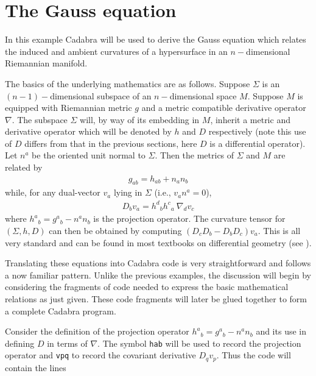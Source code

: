 \documentclass[a4paper,12pt]{article}
\numberwithin{equation}{section}%
\begin{document}
\clearpage

\section{The Gauss equation}
\label{sec:ex-09}
\setcounter{ExerciseNum}{0}



In this example Cadabra will be used to derive the Gauss equation which relates the induced
and ambient curvatures of a hypersurface in an $n-$dimensional Riemannian manifold.

The basics of the underlying mathematics are as follows. Suppose $\Sigma$ is an
$(n-1)-$dimensional subspace of an $n-$dimensional space $M$. Suppose $M$ is equipped with
Riemannian metric $g$ and a metric compatible derivative operator $\nabla$. The subspace
$\Sigma$ will, by way of its embedding in $M$, inherit a metric and derivative operator
which will be denoted by $h$ and $D$ respectively (note this use of $D$ differs from that in
the previous sections, here $D$ is a differential operator). Let $n^a$ be the oriented unit
normal to $\Sigma$. Then the metrics of $\Sigma$ and $M$ are related by
\begin{align*}
   g_{a b} = h_{a b} + n_{a} n_{b}
\end{align*}
while, for any dual-vector $v_a$ lying in $\Sigma$ (i.e., $v_a n^a=0$),
\begin{align*}
   D_{b} v_{a} = h^{d}{}_{b} h^{c}{}_{a} \> \nabla_{d} v_{c}
\end{align*}
where $h^{a}{}_{b} = g^{a}{}_{b} - n^{a} n_{b}$ is the projection operator. The curvature
tensor for $(\Sigma,h,D)$ can then be obtained by computing $\left(D_{c} D_{b}-D_{b}
D_{c}\right) v_{a}$. This is all very standard and can be found in most textbooks on
differential geometry (see \cite{chavel:2006-01}).

Translating these equations into Cadabra code is very straightforward and follows a now
familiar pattern. Unlike the previous examples, the discussion will begin by considering the
fragments of code needed to express the basic mathematical relations as just given. These
code fragments will later be glued together to form a complete Cadabra program.

Consider the definition of the projection operator $h^{a}{}_{b} = g^{a}{}_{b}-n^{a}n_{b}$
and its use in defining $D$ in terms of $\nabla$. The symbol \verb|hab| will be used to
record the projection operator and \verb|vpq| to record the covariant derivative $D_{q}v_p$.
Thus the code will contain the lines
\end{document}
